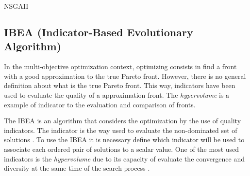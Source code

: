 \begin{algorithm}[htb!]
	\begin{algorithmic}[1]
		\EndWhile
			\EndWhile
			
		\EndWhile
	\end{algorithmic}
	\caption{NSGAII}
	\label{alg:nsgaII}
\end{algorithm}


\subsection{IBEA (Indicator-Based Evolutionary Algorithm)}


In the multi-objective optimization context, optimizing consists in find a front with a good approximation to the true Pareto front. However, there is no general definition about what is the true Pareto front. This way, indicators have been used to evaluate the quality of a approximation front. The \textit{hypervolume} is a example of indicator to the evaluation and comparison of fronts.


The IBEA is an algorithm that considers the optimization by the use of quality indicators. The indicator is the way used to evaluate the non-dominated set of solutions \cite{figueiredo2013algoritmo}. To use the IBEA it is necessary define which indicator will be used to associate each ordered pair of solutions to a scalar value. One of the most used indicators is the \textit{hypervolume} due to its capacity of evaluate the convergence and diversity at the same time of the search process \cite{ishibuchi2008evolutionary}.


